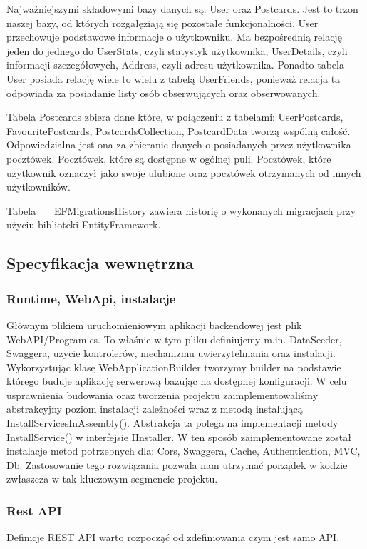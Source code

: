 \documentclass[a4paper,twoside,12pt]{book}
\begin{document}
Najważniejszymi składowymi bazy danych są: User oraz Postcards. Jest to trzon naszej bazy, od których rozgałęziają się pozostałe funkcjonalności. User przechowuje podstawowe informacje o użytkowniku. Ma bezpośrednią relację jeden do jednego do UserStats, czyli statystyk użytkownika, UserDetails, czyli informacji szczegółowych, Address, czyli adresu użytkownika. Ponadto tabela User posiada relację wiele to wielu z tabelą UserFriends, ponieważ relacja ta odpowiada za posiadanie listy osób obserwujących oraz obserwowanych.

Tabela Postcards zbiera dane które, w połączeniu z tabelami: UserPostcards, FavouritePostcards, PostcardsCollection, PostcardData tworzą wspólną całość. Odpowiedzialna jest ona za zbieranie danych o posiadanych przez użytkownika pocztówek. Pocztówek, które są dostępne w ogólnej puli. Pocztówek, które użytkownik oznaczył jako swoje ulubione oraz pocztówek otrzymanych od innych użytkowników.

Tabela \_\_EFMigrationsHistory zawiera historię o wykonanych migracjach przy użyciu biblioteki EntityFramework. 

\subsection{Specyfikacja wewnętrzna}
\subsubsection{Runtime, WebApi, instalacje}
Głównym plikiem uruchomieniowym aplikacji backendowej jest plik WebAPI/Program.cs. To właśnie w tym pliku definiujemy m.in. DataSeeder, Swaggera, użycie kontrolerów, mechanizmu uwierzytelniania oraz instalacji. Wykorzystując klasę WebApplicationBuilder tworzymy builder na podstawie którego buduje aplikację serwerową bazując na dostępnej konfiguracji. W celu usprawnienia budowania oraz tworzenia projektu zaimplementowaliśmy abstrakcyjny poziom instalacji zależności wraz z metodą instalującą InstallServicesInAssembly(). Abstrakcja ta polega na implementacji metody InstallService() w interfejsie IInstaller. W ten sposób zaimplementowane został instalacje metod potrzebnych dla: Cors, Swaggera, Cache, Authentication, MVC, Db. Zastosowanie tego rozwiązania pozwala nam utrzymać porządek w kodzie zwłaszcza w tak kluczowym segmencie projektu. 

\subsubsection{Rest API }
Definicje REST API warto rozpocząć od zdefiniowania czym jest samo API.  
\end{document}

